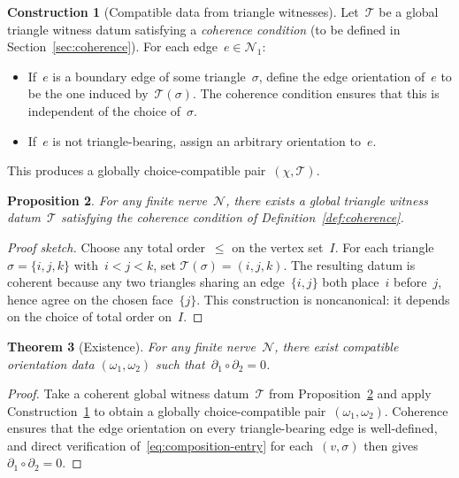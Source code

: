 \documentclass[11pt,a4paper]{article}
\theoremstyle{plain}
\newtheorem{theorem}{Theorem}[section]
\newtheorem{proposition}[theorem]{Proposition}
\theoremstyle{definition}
\newtheorem{construction}[theorem]{Construction}
\theoremstyle{remark}
\newcommand{\cN}{\mathcal{N}}
\newcommand{\cT}{\mathcal{T}}
\begin{document}
\begin{construction}[Compatible data from triangle witnesses]
\label{con:from-witnesses}
Let~$\cT$ be a global triangle witness datum satisfying a
\emph{coherence condition} (to be defined in Section~\ref{sec:coherence}).
For each edge~$e \in \cN_1$:
\begin{itemize}[nosep]
  \item If~$e$ is a boundary edge of some triangle~$\sigma$, define the
        edge orientation of~$e$ to be the one induced by~$\cT(\sigma)$.
        The coherence condition ensures that this is independent of the
        choice of~$\sigma$.
  \item If~$e$ is not triangle-bearing, assign an arbitrary orientation
        to~$e$.
\end{itemize}
This produces a globally choice-compatible pair~$(\chi, \cT)$.
\end{construction}

\begin{proposition}
\label{prop:coherent-exists}
For any finite nerve~$\cN$, there exists a global triangle witness
datum~$\cT$ satisfying the coherence condition of
Definition~\ref{def:coherence}.
\end{proposition}

\begin{proof}[Proof sketch]
Choose any total order~$\leq$ on the vertex set~$I$. For each triangle
$\sigma = \{i,j,k\}$ with~$i < j < k$, set $\cT(\sigma) = (i,j,k)$.
The resulting datum is coherent because any two triangles sharing an
edge~$\{i,j\}$ both place~$i$ before~$j$, hence agree on the chosen
face~$\{j\}$. This construction is noncanonical: it depends on the
choice of total order on~$I$.
\end{proof}

\begin{theorem}[Existence]
\label{thm:existence}
For any finite nerve~$\cN$, there exist compatible orientation data
$(\omega_1, \omega_2)$ such that~$\partial_1 \circ \partial_2 = 0$.
\end{theorem}

\begin{proof}
Take a coherent global witness datum~$\cT$ from
Proposition~\ref{prop:coherent-exists} and apply
Construction~\ref{con:from-witnesses} to obtain a globally
choice-compatible pair~$(\omega_1, \omega_2)$. Coherence ensures
that the edge orientation on every triangle-bearing edge is
well-defined, and direct verification of~\eqref{eq:composition-entry}
for each~$(v, \sigma)$ then gives~$\partial_1 \circ \partial_2 = 0$.
\end{proof}
\end{document}
